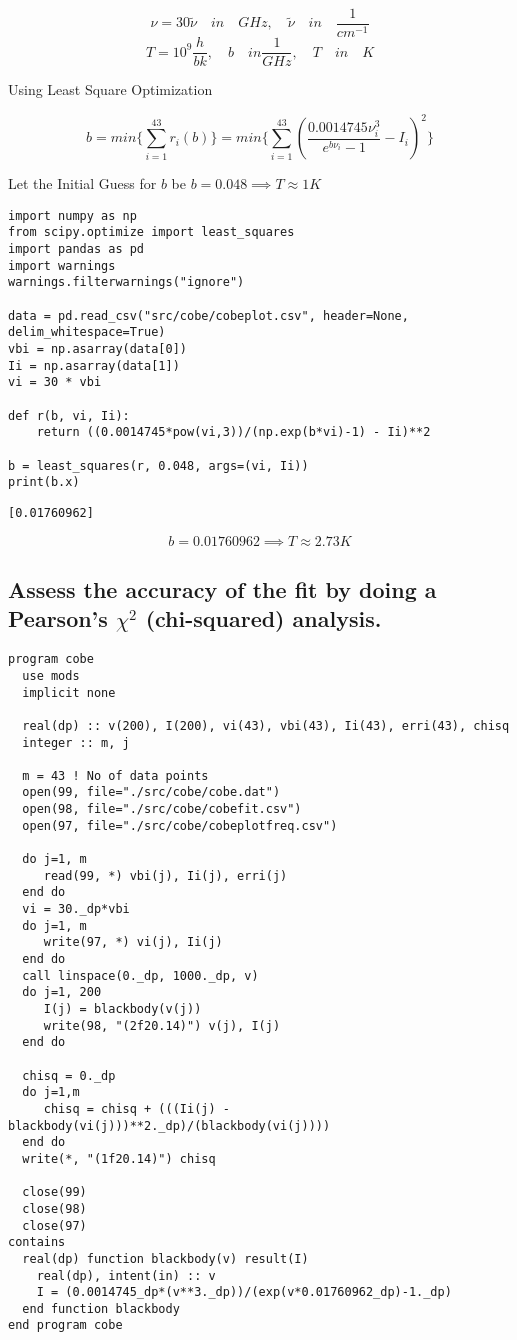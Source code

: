 \documentclass[a4paper,11pt,twoside]{article}
\begin{document}
$$
\nu = 30\widetilde{\nu}  \quad in \quad GHz, \quad
\widetilde{\nu} \quad in \quad \frac{1}{cm^{-1}}
$$
$$
T = 10^9 \frac{h}{bk}, \quad b \quad in \frac{1}{GHz}, \quad T \quad in \quad K
$$


\clearpage

Using Least Square Optimization

$$
b = min\{ \sum_{i=1}^{43} r_i(b) \} = min\{ \sum_{i=1}^{43} ( \frac{0.0014745 \nu_i^3}{e^{b\nu_i}-1} - I_i)^2 \}
$$

Let the Initial Guess for \(b\) be
\(b = 0.048  \implies T \approx 1K\)

\begin{verbatim}
import numpy as np
from scipy.optimize import least_squares
import pandas as pd
import warnings
warnings.filterwarnings("ignore")

data = pd.read_csv("src/cobe/cobeplot.csv", header=None, delim_whitespace=True)
vbi = np.asarray(data[0])
Ii = np.asarray(data[1])
vi = 30 * vbi

def r(b, vi, Ii):
    return ((0.0014745*pow(vi,3))/(np.exp(b*vi)-1) - Ii)**2

b = least_squares(r, 0.048, args=(vi, Ii))
print(b.x)
\end{verbatim}

\begin{verbatim}
[0.01760962]
\end{verbatim}


$$
b = 0.01760962  \implies T \approx 2.73K
$$


\subsection{Assess the accuracy of the fit by doing a Pearson's \(\chi^2\) (chi-squared) analysis.}
\label{sec:org3d68c8f}


\begin{verbatim}
program cobe
  use mods
  implicit none

  real(dp) :: v(200), I(200), vi(43), vbi(43), Ii(43), erri(43), chisq
  integer :: m, j

  m = 43 ! No of data points
  open(99, file="./src/cobe/cobe.dat")
  open(98, file="./src/cobe/cobefit.csv")
  open(97, file="./src/cobe/cobeplotfreq.csv")

  do j=1, m
     read(99, *) vbi(j), Ii(j), erri(j)
  end do
  vi = 30._dp*vbi
  do j=1, m
     write(97, *) vi(j), Ii(j)
  end do
  call linspace(0._dp, 1000._dp, v)
  do j=1, 200
     I(j) = blackbody(v(j))
     write(98, "(2f20.14)") v(j), I(j)
  end do

  chisq = 0._dp
  do j=1,m
     chisq = chisq + (((Ii(j) - blackbody(vi(j)))**2._dp)/(blackbody(vi(j))))
  end do
  write(*, "(1f20.14)") chisq
  
  close(99)
  close(98)
  close(97)
contains
  real(dp) function blackbody(v) result(I)
    real(dp), intent(in) :: v
    I = (0.0014745_dp*(v**3._dp))/(exp(v*0.01760962_dp)-1._dp)
  end function blackbody
end program cobe
\end{verbatim}
\end{document}
